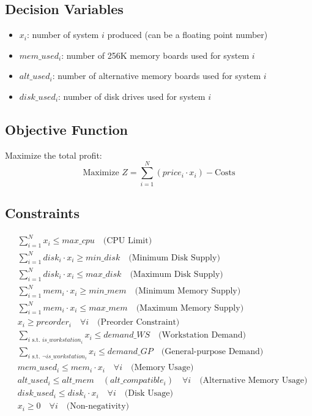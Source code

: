 \documentclass{article}
\begin{document}
\subsection*{Decision Variables}
\begin{itemize}
    \item $x_i$: number of system $i$ produced (can be a floating point number)
    \item $mem\_used_i$: number of 256K memory boards used for system $i$
    \item $alt\_used_i$: number of alternative memory boards used for system $i$
    \item $disk\_used_i$: number of disk drives used for system $i$
\end{itemize}

\subsection*{Objective Function}
Maximize the total profit:
\[
\text{Maximize } Z = \sum_{i=1}^{N} (price_i \cdot x_i) - \text{Costs}
\]

\subsection*{Constraints}

\begin{align}
    & \sum_{i=1}^{N} x_i \leq max\_cpu \quad \text{(CPU Limit)} \\
    & \sum_{i=1}^{N} disk_i \cdot x_i \geq min\_disk \quad \text{(Minimum Disk Supply)} \\
    & \sum_{i=1}^{N} disk_i \cdot x_i \leq max\_disk \quad \text{(Maximum Disk Supply)} \\
    & \sum_{i=1}^{N} mem_i \cdot x_i \geq min\_mem \quad \text{(Minimum Memory Supply)} \\
    & \sum_{i=1}^{N} mem_i \cdot x_i \leq max\_mem \quad \text{(Maximum Memory Supply)} \\
    & x_i \geq preorder_i \quad \forall i \quad \text{(Preorder Constraint)} \\
    & \sum_{i \text{ s.t. } is\_workstation_i} x_i \leq demand\_WS \quad \text{(Workstation Demand)} \\
    & \sum_{i \text{ s.t. } \neg is\_workstation_i} x_i \leq demand\_GP \quad \text{(General-purpose Demand)} \\
    & mem\_used_i \leq mem_i \cdot x_i \quad \forall i \quad \text{(Memory Usage)} \\
    & alt\_used_i \leq alt\_mem \quad (alt\_compatible_i) \quad \forall i \quad \text{(Alternative Memory Usage)} \\
    & disk\_used_i \leq disk_i \cdot x_i \quad \forall i \quad \text{(Disk Usage)} \\
    & x_i \geq 0 \quad \forall i \quad \text{(Non-negativity)}
\end{align}
\end{document}

